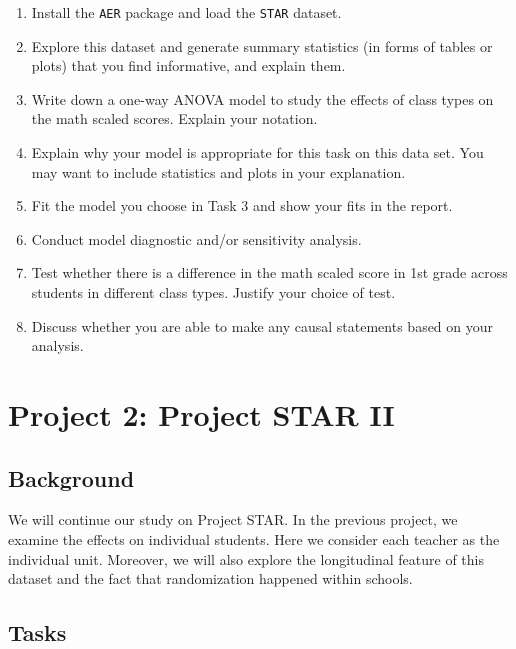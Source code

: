 \documentclass[12pt,]{book}
\providecommand{\tightlist}{%
  \setlength{\itemsep}{0pt}\setlength{\parskip}{0pt}}
\begin{document}
\begin{enumerate}
\def\labelenumi{\arabic{enumi}.}
\tightlist
\item
  Install the \texttt{AER} package and load the \texttt{STAR} dataset.\\
\item
  Explore this dataset and generate summary statistics (in forms of
  tables or plots) that you find informative, and explain them.\\
\item
  Write down a one-way ANOVA model to study the effects of class types
  on the math scaled scores. Explain your notation.
\item
  Explain why your model is appropriate for this task on this data set.
  You may want to include statistics and plots in your explanation.
\item
  Fit the model you choose in Task 3 and show your fits in the report.
\item
  Conduct model diagnostic and/or sensitivity analysis.
\item
  Test whether there is a difference in the math scaled score in 1st
  grade across students in different class types. Justify your choice of
  test.
\item
  Discuss whether you are able to make any causal statements based on
  your analysis.
\end{enumerate}

\section{Project 2: Project STAR II}\label{project-2-project-star-ii}

\subsection{Background}\label{background-1}

We will continue our study on Project STAR. In the previous project, we
examine the effects on individual students. Here we consider each
teacher as the individual unit. Moreover, we will also explore the
longitudinal feature of this dataset and the fact that randomization
happened within schools.

\subsection{Tasks}\label{tasks-1}
\end{document}
